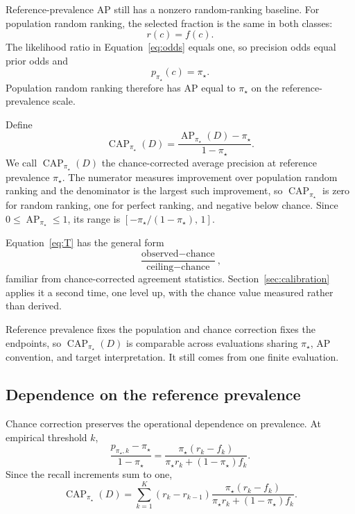 \documentclass[11pt]{article}
\newcommand{\AP}{\operatorname{AP}}
\newcommand{\CAP}{\operatorname{CAP}}
\newcommand{\Tpi}{\CAP_{\pi_\star}}
\theoremstyle{remark}
\begin{document}
Reference-prevalence AP still has a nonzero random-ranking baseline. For population random ranking, the selected fraction is the same in both classes:
\[
r(c)=f(c).
\]
The likelihood ratio in Equation~\eqref{eq:odds} equals one, so precision odds equal prior odds and
\[
p_{\pi_\star}(c)=\pi_\star.
\]
Population random ranking therefore has AP equal to $\pi_\star$ on the reference-prevalence scale.

Define
\begin{equation}
\Tpi(D)
=
\frac{\AP_{\pi_\star}(D)-\pi_\star}{1-\pi_\star}.
\label{eq:T}
\end{equation}
We call $\Tpi(D)$ the chance-corrected average precision at reference prevalence $\pi_\star$. The numerator measures improvement over population random ranking and the denominator is the largest such improvement, so $\Tpi$ is zero for random ranking, one for perfect ranking, and negative below chance. Since $0\leq \AP_{\pi_\star}\leq 1$, its range is $[-\pi_\star/(1-\pi_\star),\,1]$.

Equation~\eqref{eq:T} has the general form
\begin{equation}
\frac{\text{observed}-\text{chance}}{\text{ceiling}-\text{chance}},
\label{eq:kappa-form}
\end{equation}
familiar from chance-corrected agreement statistics. Section~\ref{sec:calibration} applies it a second time, one level up, with the chance value measured rather than derived.

Reference prevalence fixes the population and chance correction fixes the endpoints, so $\Tpi(D)$ is comparable across evaluations sharing $\pi_\star$, AP convention, and target interpretation. It still comes from one finite evaluation.

\subsection{Dependence on the reference prevalence}

Chance correction preserves the operational dependence on prevalence. At empirical threshold $k$,
\begin{equation}
\frac{p_{\pi_\star,k}-\pi_\star}{1-\pi_\star}
=
\frac{\pi_\star(r_k-f_k)}
{\pi_\star r_k+(1-\pi_\star)f_k}.
\label{eq:threshold-normalized-effect}
\end{equation}
Since the recall increments sum to one,
\begin{equation}
\Tpi(D)
=
\sum_{k=1}^{K}
(r_k-r_{k-1})
\frac{\pi_\star(r_k-f_k)}
{\pi_\star r_k+(1-\pi_\star)f_k}.
\label{eq:T-reference-dependence}
\end{equation}
\end{document}
